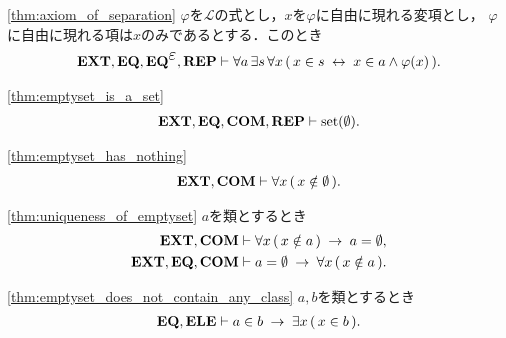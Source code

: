 	\begin{screen}
		\begin{thm}[分出定理]\ref{thm:axiom_of_separation}
			$\varphi$を$\mathcal{L}$の式とし，$x$を$\varphi$に自由に現れる変項とし，
			$\varphi$に自由に現れる項は$x$のみであるとする．このとき
			\begin{align}
				\EXTAX,\EQAX,\EQAXEP,\REPAX \vdash 
				\forall a\, \exists s\, \forall x\,
				(\, x \in s \lrarrow x \in a \wedge \varphi(x)\, ).
			\end{align}
		\end{thm}
	\end{screen}
	
	\begin{screen}
		\begin{thm}\ref{thm:emptyset_is_a_set}
			\begin{align}
				\mbox{{\bf EXT}},\mbox{{\bf EQ}},\mbox{\bf COM},\mbox{{\bf REP}} \vdash \operatorname*{set} (\emptyset).
			\end{align}
		\end{thm}
	\end{screen}
	
	\begin{screen}
		\begin{thm}[空集合はいかなる集合も持たない]\ref{thm:emptyset_has_nothing}
			\begin{align}
				\mbox{{\bf EXT}},\mbox{\bf COM} \vdash \forall x\, (\, x \notin \emptyset\, ).
			\end{align}
		\end{thm}
	\end{screen}
	
	\begin{screen}
		\begin{thm}[空の類は空集合に等しい]\ref{thm:uniqueness_of_emptyset}
			$a$を類とするとき
			\begin{align}
				\mbox{{\bf EXT}},\mbox{\bf COM} &\vdash \forall x\, (\, x \notin a\, ) \hspace{0.25em}\rightarrow\hspace{0.25em} a = \emptyset, \\
				\mbox{{\bf EXT}},\mbox{{\bf EQ}},\mbox{\bf COM} &\vdash a = \emptyset \hspace{0.25em}\rightarrow\hspace{0.25em} \forall x\, (\, x \notin a\, ).
			\end{align}
		\end{thm}
	\end{screen}
	
	\begin{screen}
		\begin{thm}[類を要素として持てば空ではない]
		\ref{thm:emptyset_does_not_contain_any_class}
			$a,b$を類とするとき
			\begin{align}
				\mbox{{\bf EQ}},\mbox{{\bf ELE}} \vdash a \in b \hspace{0.25em}\rightarrow\hspace{0.25em} \exists x\, (\, x \in b\, ).
			\end{align}
		\end{thm}
	\end{screen}
	
